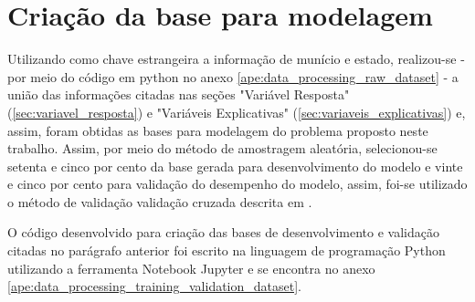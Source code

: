 \section{Criação da base para modelagem}
\label{sec:criacao_da_base_para_modelagem}

Utilizando como chave estrangeira a informação de munício e estado, realizou-se - por meio do código em python no anexo \ref{ape:data_processing_raw_dataset} - a união das informações citadas nas seções "Variável Resposta" (\ref{sec:variavel_resposta}) e "Variáveis Explicativas" (\ref{sec:variaveis_explicativas}) e, assim, foram obtidas as bases para modelagem do problema proposto neste trabalho. Assim, por meio do método de amostragem aleatória, selecionou-se setenta e cinco por cento da base gerada para desenvolvimento do modelo e vinte e cinco por cento para validação do desempenho do modelo, assim, foi-se utilizado o método de validação validação cruzada descrita em \citet{Wesllen2017:MSc}.

O código desenvolvido para criação das bases de desenvolvimento e validação citadas no parágrafo anterior foi escrito na linguagem de programação Python utilizando a ferramenta Notebook Jupyter e se encontra no anexo \ref{ape:data_processing_training_validation_dataset}.

